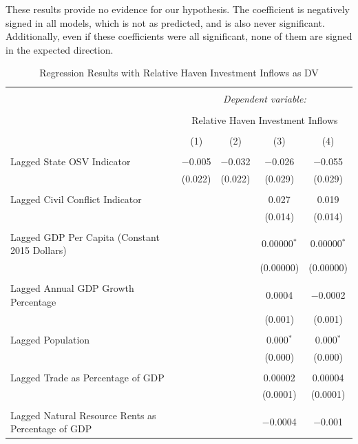 \documentclass[11pt, titlepage]{article} %
\begin{document}
These results provide no evidence for our hypothesis. The coefficient is negatively signed in all models, which is not as predicted, and is also never significant. Additionally, even if these coefficients were all significant, none of them are signed in the expected direction.

\begin{table}[!htbp] \centering 
  \caption{Regression Results with Relative Haven Investment Inflows as DV} 
  \label{relhavenDV} 
\small 
\begin{tabular}{@{\extracolsep{5pt}}lcccc} 
\\[-1.8ex]\hline 
\hline \\[-1.8ex] 
 & \multicolumn{4}{c}{\textit{Dependent variable:}} \\ 
\cline{2-5} 
\\[-1.8ex] & \multicolumn{4}{c}{Relative Haven Investment Inflows} \\ 
\\[-1.8ex] & (1) & (2) & (3) & (4)\\ 
\hline \\[-1.8ex] 
 Lagged State OSV Indicator & $-$0.005 & $-$0.032 & $-$0.026 & $-$0.055 \\ 
  & (0.022) & (0.022) & (0.029) & (0.029) \\ 
  & & & & \\ 
 Lagged Civil Conflict Indicator &  &  & 0.027 & 0.019 \\ 
  &  &  & (0.014) & (0.014) \\ 
  & & & & \\ 
 Lagged GDP Per Capita (Constant 2015 Dollars) &  &  & 0.00000$^{*}$ & 0.00000$^{*}$ \\ 
  &  &  & (0.00000) & (0.00000) \\ 
  & & & & \\ 
 Lagged Annual GDP Growth Percentage &  &  & 0.0004 & $-$0.0002 \\ 
  &  &  & (0.001) & (0.001) \\ 
  & & & & \\ 
 Lagged Population &  &  & 0.000$^{*}$ & 0.000$^{*}$ \\ 
  &  &  & (0.000) & (0.000) \\ 
  & & & & \\ 
 Lagged Trade as Percentage of GDP &  &  & 0.00002 & 0.00004 \\ 
  &  &  & (0.0001) & (0.0001) \\ 
  & & & & \\ 
 Lagged Natural Resource Rents as Percentage of GDP &  &  & $-$0.0004 & $-$0.001 \\ 

\end{tabular}
\end{table}
\end{document}
